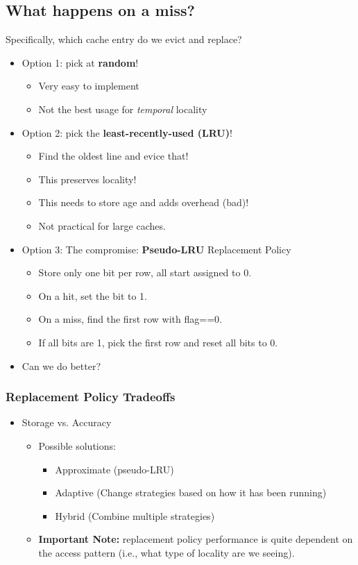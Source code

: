 \documentclass[10pt]{article}
\begin{document}
\subsection*{What happens on a miss?}
Specifically, which cache entry do we evict and replace?
\begin{itemize}
    \item Option 1: pick at \textbf{random}!
    \begin{itemize}
        \item Very easy to implement
        \item Not the best usage for \textit{temporal} locality
    \end{itemize}
    \item Option 2: pick the \textbf{least-recently-used (LRU)}!
    \begin{itemize}
        \item Find the oldest line and evice that!
        \item This preserves locality!
        \item This needs to store age and adds overhead (bad)!
        \item Not practical for large caches.
    \end{itemize}
    \item Option 3: The compromise: \textbf{Pseudo-LRU} Replacement Policy
    \begin{itemize}
        \item Store only one bit per row, all start assigned to 0.
        \item On a hit, set the bit to 1.
        \item On a miss, find the first row with flag==0.
        \item If all bits are 1, pick the first row and reset all bits to 0.
    \end{itemize}
    \item Can we do better?
\end{itemize}
\subsubsection*{Replacement Policy Tradeoffs}
\begin{itemize}
    \item Storage vs. Accuracy
    \begin{itemize}
        \item Possible solutions:
        \begin{itemize}
            \item Approximate (pseudo-LRU)
            \item Adaptive (Change strategies based on how it has been running)
            \item Hybrid (Combine multiple strategies)
        \end{itemize}
        \item \textbf{Important Note:} replacement policy performance is quite dependent on the access pattern (i.e., what type of locality are we seeing).
    \end{itemize}
\end{itemize}
\end{document}
